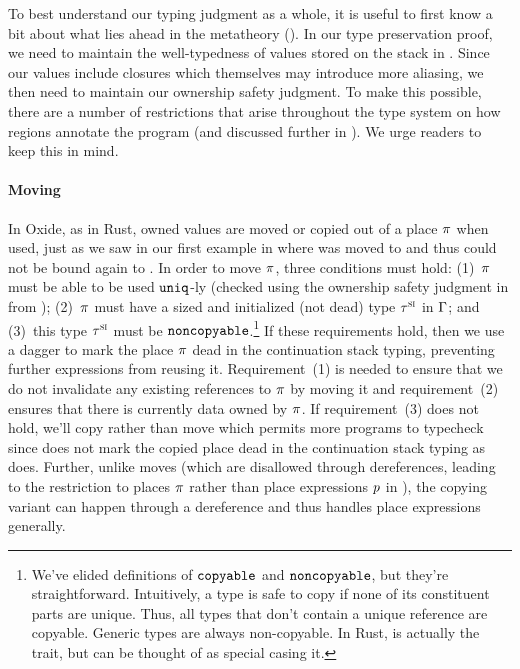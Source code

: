 To best understand our typing judgment as a whole, it is useful to first know a
bit about what lies ahead in the metatheory (). In our type
preservation proof, we need to maintain the well-typedness of values stored on
the stack in \lang. Since our values include closures which themselves may
introduce more aliasing, we then need to maintain our ownership safety judgment.
To make this possible, there are a number of restrictions that arise throughout
the type system on how regions annotate the program (and discussed further in
). We urge readers to keep this in mind.

\paragraph{Moving} In Oxide, as in Rust, owned values are moved or copied out of
a place $\pi$ when used, just as we saw in our first example in
 where  was moved to  and thus could not
be bound again to . In order to move $\pi$, three conditions must
hold: (1)~$\pi$ must be able to be used $\mathtt{uniq}$-ly (checked using the
ownership safety judgment in  from );
(2)~$\pi$ must have a sized and initialized (not dead) type $\tau^\textsc{si}$ in
$\Gamma$; and (3)~this type $\tau^\textsc{si}$ must be
$\mathtt{noncopyable}$.\footnote{We've elided definitions of $\mathtt{copyable}$
  and $\mathtt{noncopyable}$, but they're straightforward. Intuitively, a type is
  safe to copy if none of its constituent parts are unique. Thus, all types that
  don't contain a unique reference are copyable. Generic types are always
  non-copyable. In Rust,  is actually the  trait,
  but  can be thought of as special casing it.} If these
requirements hold, then we use a dagger to mark the place $\pi$ dead in the
continuation stack typing, preventing further expressions from reusing it.
Requirement~(1) is needed to ensure that we do not invalidate any existing
references to $\pi$ by moving it and requirement~(2) ensures that there is
currently data owned by $\pi$. If requirement~(3) does not hold, we'll copy
rather than move which permits more programs to typecheck since 
does not mark the copied place dead in the continuation stack typing as
 does. Further, unlike moves (which are disallowed through
dereferences, leading to the restriction to places $\pi$ rather than place
expressions $p$ in ), the copying variant
 can happen through a dereference and thus handles place
expressions generally.

